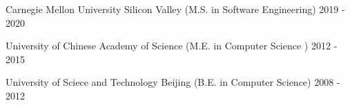 
\begin{cventries}

  \cventry
    {} %
    {Carnegie Mellon University Silicon Valley   (M.S. in Software Engineering)} %
    {2019 - 2020} %
    {}
    {}
    
    
    \vspace{-1.2cm}

 \cventry
    {} 
    {University of Chinese Academy of Science    (M.E. in Computer Science )} %
    {2012 - 2015} %
    {}
    {
    }

\vspace{-1.2cm}

 \cventry
    {} 
    {University of Sciece and Technology Beijing (B.E. in Computer Science)} %
    {2008 - 2012} %
    {}
    {
    }
\vspace{-1.0cm}
\end{cventries}
